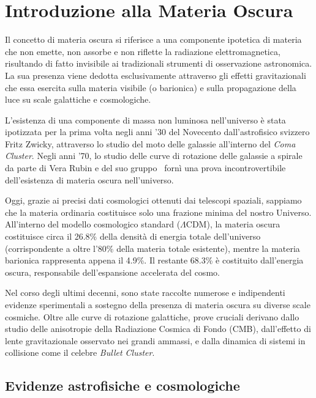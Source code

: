 \chapter{Introduzione alla Materia Oscura}
\label{ch:materia_oscura}

Il concetto di materia oscura si riferisce a una componente ipotetica di materia che non emette, non assorbe e non riflette la radiazione elettromagnetica, risultando di fatto invisibile ai tradizionali strumenti di osservazione astronomica. La sua presenza viene dedotta esclusivamente attraverso gli effetti gravitazionali che essa esercita sulla materia visibile (o barionica) e sulla propagazione della luce su scale galattiche e cosmologiche.

L'esistenza di una componente di massa non luminosa nell'universo è stata ipotizzata per la prima volta negli anni '30 del Novecento dall'astrofisico svizzero Fritz Zwicky, attraverso lo studio del moto delle galassie all'interno del \textit{Coma Cluster}. 
Negli anni '70, lo studio delle curve di rotazione delle galassie a spirale da parte di Vera Rubin e del suo gruppo~\cite{RubinFordThonnard1980} fornì una prova incontrovertibile dell'esistenza di materia oscura nell'universo.

Oggi, grazie ai precisi dati cosmologici ottenuti dai telescopi spaziali, sappiamo che la materia ordinaria costituisce solo una frazione minima del nostro Universo. All'interno del modello cosmologico standard ($\Lambda$CDM), la materia oscura costituisce circa il 26.8\% della densità di energia totale dell'universo (corrispondente a oltre l'80\% della materia totale esistente), mentre la materia barionica rappresenta appena il 4.9\%. Il restante 68.3\% è costituito dall'energia oscura, responsabile dell'espansione accelerata del cosmo.

Nel corso degli ultimi decenni, sono state raccolte numerose e indipendenti evidenze sperimentali a sostegno della presenza di materia oscura su diverse scale cosmiche. Oltre alle curve di rotazione galattiche, prove cruciali derivano dallo studio delle anisotropie della Radiazione Cosmica di Fondo (CMB), dall'effetto di lente gravitazionale osservato nei grandi ammassi, e dalla dinamica di sistemi in collisione come il celebre \textit{Bullet Cluster}. 

\section{Evidenze astrofisiche e cosmologiche}
\label{sec:evidenze}

